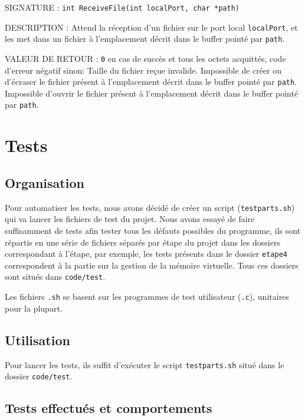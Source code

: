 \documentclass{article}
\begin{document}
		\begin{description}
			\item{SIGNATURE : } \texttt{int ReceiveFile(int localPort, char *path)}
			\item{DESCRIPTION : Attend la réception d'un fichier sur le port local \texttt{localPort}, et les met dans un fichier à l'emplacement décrit dans le buffer pointé par \texttt{path}.} 
			\item{VALEUR DE RETOUR : } \texttt{0} en cas de succès et tous les octets acquittés, code d'erreur négatif sinon: 
				 Taille du fichier reçue invalide.
				 Impossible de créer ou d'écraser le fichier présent à l'emplacement décrit dans le buffer pointé par \texttt{path}.
				 Impossible d'ouvrir le fichier présent à l'emplacement décrit dans le buffer pointé par \texttt{path}.
		\end{description}
		\vspace{2.5mm}

\section{Tests}
	\subsection{Organisation}
		{Pour automatiser les tests, nous avons décidé de créer un script (\texttt{testparts.sh}) qui va lancer les fichiers de test du projet. Nous avons essayé de faire suffisamment de tests afin tester tous les défauts possibles du programme, ils sont répartis en une série de fichiers séparés par étape du projet dans les dossiers correspondant à l'étape, par exemple, les tests présents dans le dossier \texttt{etape4} correspondent à la partie sur la gestion de la mémoire virtuelle. Tous ces dossiers sont situés dans \texttt{code/test}.}
		~\par{Les fichiers \texttt{.sh} se basent sur les programmes de test utilisateur (\texttt{.c}), unitaires pour la plupart.}

	\subsection{Utilisation}
		{Pour lancer les tests, ils suffit d'exécuter le script \texttt{testparts.sh} situé dans le dossier \texttt{code/test}.}

	\subsection{Tests effectués et comportements}
\end{document}
